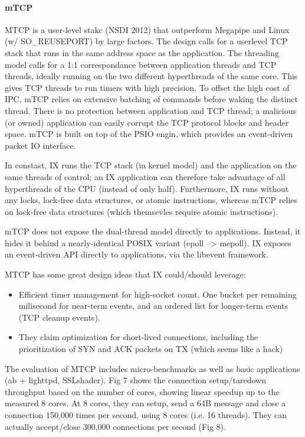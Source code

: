 \paragraph{mTCP}

MTCP is a user-level stakc (NSDI 2012) that outperform Megapipe and
Linux (w/ SO\_REUSEPORT) by large factors.  The design calls for a
userlevel TCP stack that runs in the same address space as the
application. The threading model calls for a 1:1 correspondance
between application threads and TCP threads, ideally running on the
two different hyperthreads of the same core.  This gives TCP threads
to run timers with high precision.  To offset the high cost of IPC,
mTCP relies on extensive batching of commands before waking the
distinct thread.  There is no protection between application and TCP
thread; a malicious (or owned) application can easily corrupt the TCP
protocol blocks and header space.  mTCP is built on top of the PSIO
engin, which provides an event-driven packet IO interface.

In constast, IX runs the TCP stack (in kernel model) and the
application on the same threads of control; an IX application can
therefore take advantage of all hyperthreads of the CPU (instead of
only half).  Furthermore, IX runs without any locks, lock-free data
structures, or atomic instructions, whereas mTCP relies on lock-free
data structures (which themsevles require atomic instructions).

mTCP does not expose the dual-thread model directly to
applications. Instead, it hides it behind a nearly-identical POSIX
variant (epoll --> mepoll).  IX exposes an event-driven API directly
to applications, via the libevent framework.

MTCP has some great design ideas that IX could/should leverage:

\begin{itemize}

\item Efficient timer management for high-socket count.  One bucket
  per remaining milisecond for near-term events, and an ordered list
  for longer-term events (TCP cleanup events).

\item They claim optimization for
short-lived connections, including the prioritization of SYN and ACK
packets on TX (which seems like a hack)

\end{itemize}

The evaluation of MTCP includes micro-benchmarks as well as basic
applications (ab + lighttpd, SSLshader).  Fig 7 shows the connection
setup/taredown throughput based on the number of cores, showing linear
speedup up to the measured 8 cores.  At 8 cores, they can setup, send
a 64B message and close a connection 150,000 times per second, using 8
cores (i.e. 16 threads).  They can actually accept/close 300,000
connections per second (Fig 8).

